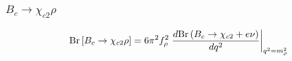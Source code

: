 \documentclass{beamer}
\begin{document}
\begin{frame}[t]
\begin{columns}
\begin{column}{0.5\textwidth}
    \end{column}
  \end{columns}
\end{frame}


\begin{frame}
  \frametitle{$B_c \to \chi_{c2} \rho$}
  $$
  \mathrm{Br}\left[B_c \to \chi_{c2} \rho\right] =
  6\pi^2 f_\rho^2 \left.
    \frac{d\mathrm{Br}\left(B_c\to\chi_{c2}+e\nu\right)}{dq^2}
  \right|_{q^2=m_\rho^2}
  $$
  \begin{columns}
    \begin{column}{0.5\textwidth}
      \vspace{3mm}
      
    \end{column}
  \begin{column}{0.5\textwidth}
      \\
      \vspace{3mm}
      
    \end{column}
\end{columns}
\end{frame}
\end{document}
